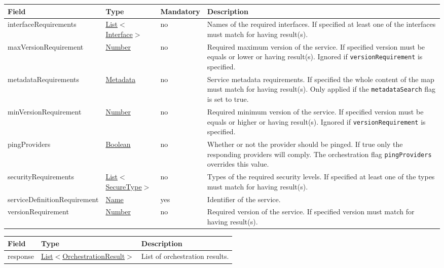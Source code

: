 \documentclass[a4paper]{arrowhead}
\newcommand{\pref}[1]{{\textcolor{ArrowheadGrey}{\hyperref[sec:model:primitives:#1]{#1}}}}
\begin{document}
\clearpage

\label{sec:model:SQF}

\begin{table}[ht!]
\begin{tabularx}{\textwidth}{| p{5cm} | p{3cm} | p{2cm} | X |} \hline
\rowcolor{gray!33} Field & Type & Mandatory & Description \\ \hline
interfaceRequirements &\pref{List}$<$\pref{Interface}$>$ & no & Names of the required interfaces. If specified at least one of the interfaces must match for having result(s). \\ \hline
maxVersionRequirement &\pref{Number} & no & Required maximum version of the service. If specified version must be equals or lower or having result(s). Ignored if \texttt{versionRequirement} is specified. \\ \hline
metadataRequirements &\hyperref[sec:model:Metadata]{Metadata} & no & Service metadata requirements. If specified the whole content of the map must match for having result(s). Only applied if the \texttt{metadataSearch} flag is set to true. \\ \hline
minVersionRequirement &\pref{Number} & no & Required minimum version of the service. If specified version must be equals or higher or having result(s). Ignored if \texttt{versionRequirement} is specified. \\ \hline
pingProviders &\pref{Boolean} & no & Whether or not the provider should be pinged. If true only the responding providers will comply. The orchestration flag \texttt{pingProviders} overrides this value. \\ \hline
securityRequirements &\pref{List}$<$\pref{SecureType}$>$ & no & Types of the required security levels. If specified at least one of the types must match for having result(s). \\ \hline
serviceDefinitionRequirement &\pref{Name} & yes & Identifier of the service. \\ \hline
versionRequirement &\pref{Number} & no & Required version of the service. If specified version must match for having result(s). \\ \hline
\end{tabularx}
\end{table}

\label{sec:model:OrchestrationResultList}

\begin{table}[ht!]
\begin{tabularx}{\textwidth}{| p{3cm} | p{6cm} | X |} \hline
\rowcolor{gray!33} Field & Type & Description \\ \hline
response & \pref{List}$<$\hyperref[sec:model:OrchestrationResult]{OrchestrationResult}$>$ & List of orchestration results. \\ \hline
\end{tabularx}
\end{table}
\end{document}
